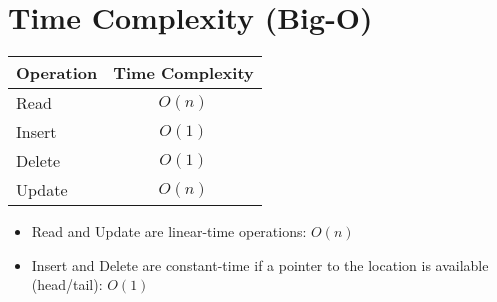 \documentclass{article}
\begin{document}
\section{Time Complexity (Big-O)}
\begin{tabular}{|l|c|}
\hline
\textbf{Operation} & \textbf{Time Complexity} \\
\hline
Read   & $O(n)$ \\
Insert & $O(1)$ \\
Delete & $O(1)$ \\
Update & $O(n)$ \\
\hline
\end{tabular}

\begin{itemize}
    \item Read and Update are linear-time operations: $O(n)$
    \item Insert and Delete are constant-time if a pointer to the location is available (head/tail): $O(1)$
\end{itemize}
\end{document}
